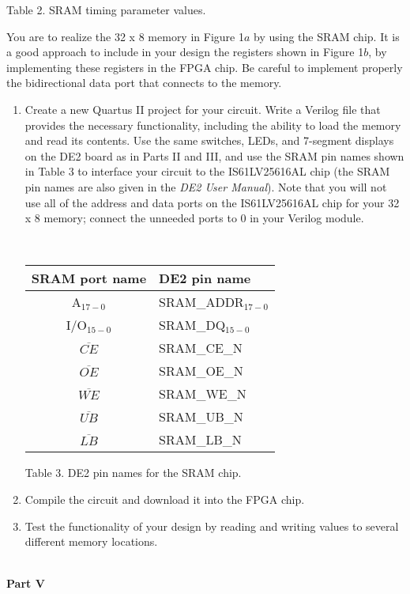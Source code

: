 \documentclass[psfig,10pt,fullpage]{article}
\begin{document}
\begin{center}
Table 2. SRAM timing parameter values.
\end{center}

\noindent
You are to realize the 32 {\sf x} 8 memory in Figure 1$a$ by using the SRAM chip. 
It is a good approach to include in your design the registers shown in Figure 1$b$, by
implementing these registers in the FPGA chip.
Be careful to implement properly the bidirectional data port that connects to the memory.

\begin{enumerate}
\item Create a new Quartus II project for your circuit. Write a Verilog file that provides
the necessary functionality, including the ability to load the memory and read its 
contents. Use the same switches, LEDs, and 7-segment displays on the DE2 board 
as in Parts II and III, and use the SRAM pin names shown in Table 3 to interface your 
circuit to the IS61LV25616AL chip (the SRAM pin names are also given in the 
{\it DE2 User Manual}). Note that you will not use all of the address and data ports on the
IS61LV25616AL chip for your 32 {\sf x} 8 memory; connect the unneeded ports to 0 in
your Verilog module.

~\\
\begin{center}
\begin{tabular}{c|l}
SRAM port name & DE2 pin name \\ \hline
\rule[-0.075in]{0in}{0.25in} A$_{17-0}$ & SRAM\_ADDR$_{17-0}$\\ 
I/O$_{15-0}$ & SRAM\_DQ$_{15-0}$\\ 
$\overline{CE}$ & SRAM\_CE\_N\\ 
$\overline{OE}$ & SRAM\_OE\_N\\ 
$\overline{WE}$ & SRAM\_WE\_N\\ 
$\overline{UB}$ & SRAM\_UB\_N\\ 
$\overline{LB}$ & SRAM\_LB\_N\\ 
\end{tabular}
\end{center}

\begin{center}
Table 3. DE2 pin names for the SRAM chip.
\end{center}

\item Compile the circuit and download it into the FPGA chip.
\item Test the functionality of your design by reading and writing values to several
different memory locations.
\end{enumerate}
~\\
\noindent
{\bf Part V}
\end{document}
